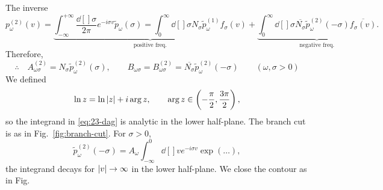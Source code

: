 The inverse
\begin{equation}
  p_\omega^{(2)}(v) = \underbrace{\int_{-\infty}^{+\infty} \frac{\dd[]{\sigma}}{2\pi} e ^{-i \sigma v} \widetilde{p}_{\omega}(\sigma) = \int_0^{\infty} \dd[]{\sigma} N_\sigma \widetilde{p}_{\omega}^{(1)} f_\sigma(v)}_{\text{positive freq.}} + \underbrace{\int_0^{\infty} \dd[]{\sigma} \overline{N_\sigma}{} \widetilde{p}_\omega^{(2)} (-\sigma) \overline{f_\sigma(v)}{}}_{\text{negative freq.}}.
\end{equation}
Therefore, 
\begin{equation}
  \therefore \quad  A^{(2)}_{\omega \sigma} = N_\sigma \widetilde{p}_\omega^{(2)} (\sigma), \qquad B_{\omega \sigma} = B_{\omega \sigma}^{(2)} = \overline{N_\sigma}{} \widetilde{p}_\omega^{(2)} (-\sigma) \qquad (\omega, \sigma > 0 )
\end{equation}
We defined
\begin{equation}
  \ln z = \ln \abs{z} + i \arg z, \qquad \arg z \in \left( -\frac{\pi}{2}, \frac{3\pi}{2} \right),
\end{equation}
so the integrand in \eqref{eq:23-dag} is analytic in the lower half-plane.
The branch cut is as in Fig.~\ref{fig:branch-cut}.
For $\sigma > 0$, 
\begin{equation}
  \widetilde{p}_{\omega}^{(2)}(-\sigma) = A_\omega \int_{-\infty}^0 \dd[]{v} e^{-i \sigma v} \exp(\dots),
\end{equation}
the integrand decays for $\abs{v} \to \infty$ in the lower half-plane.
We close the contour as in Fig.~%

